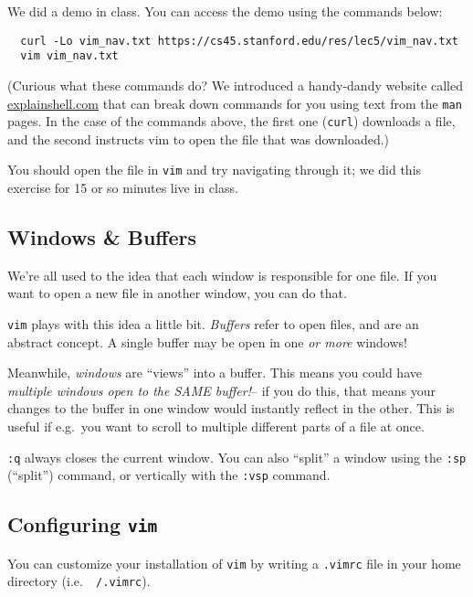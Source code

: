 \begin{example}[codeblock]
  We did a demo in class. You can access the demo using the commands below:
  \begin{verbatim}
  curl -Lo vim_nav.txt https://cs45.stanford.edu/res/lec5/vim_nav.txt
  vim vim_nav.txt
  \end{verbatim}
\end{example}

(Curious what these commands do? We introduced a handy-dandy website called
\href{https://explainshell.com/explain?cmd=curl+-Lo+vim_nav.txt+https%3A%2F%2Fcs45.stanford.edu%2Fres%2Flec5%2Fvim_nav.txt#}{explainshell.com}
that can break down commands for you using text from the {\tt man} pages. In the
case of the commands above, the first one ({\tt curl}) downloads a file, and the second
instructs vim to open the file that was downloaded.)

You should open the file in {\tt vim} and try navigating through it; we did
this exercise for 15 or so minutes live in class.

\subsection{Windows \& Buffers}

We're all used to the idea that each window is responsible for one file. If you want
to open a new file in another window, you can do that.

{\tt vim} plays with this idea a little bit. {\em Buffers} refer to open files,
and are an abstract concept. A single buffer may be open in one {\em or more} windows!

Meanwhile, {\em windows} are ``views'' into a buffer. This means you could have
{\em multiple windows open to the SAME buffer!}-- if you do this, that means your changes
to the buffer in one window would instantly reflect in the other. This is useful if e.g.\ 
you want to scroll to multiple different parts of a file at once.

{\tt :q} always closes the current window. You can also ``split'' a window using the
{\tt :sp} (``split'') command, or vertically with the {\tt :vsp} command.

\subsection{Configuring {\tt vim}}

You can customize your installation of {\tt vim} by writing a {\tt .vimrc} file in
your home directory (i.e.\ {\tt ~/.vimrc}).

